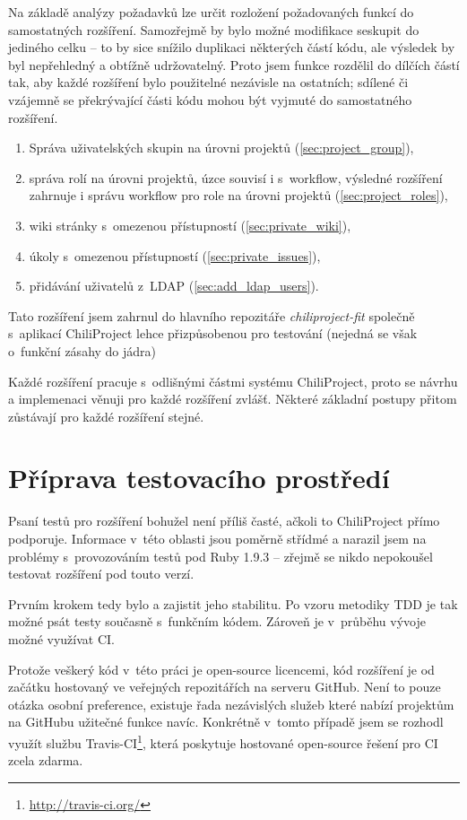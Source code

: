 \documentclass[thesis=B,czech]{FITthesis}[2012/05/02]
\begin{document}
Na základě analýzy požadavků lze určit rozložení požadovaných
funkcí do samostatných rozšíření. Samozřejmě by bylo možné modifikace
seskupit do jediného celku -- to by sice snížilo duplikaci některých částí kódu,
ale výsledek by byl nepřehledný a obtížně udržovatelný. Proto jsem funkce
rozdělil do dílčích částí tak, aby každé rozšíření bylo použitelné
nezávisle na ostatních; sdílené či vzájemně se překrývající části kódu
mohou být vyjmuté do samostatného rozšíření.

\begin{enumerate}
\item Správa uživatelských skupin na úrovni projektů (\ref{sec:project_group}),
\item správa rolí na úrovni projektů, úzce souvisí i s~\gls{workflow}, výsledné rozšíření zahrnuje i
správu workflow pro role na úrovni projektů (\ref{sec:project_roles}),
\item wiki stránky s~omezenou přístupností (\ref{sec:private_wiki}),
\item úkoly s~omezenou přístupností (\ref{sec:private_issues}),
\item přidávání uživatelů z~\gls{LDAP} (\ref{sec:add_ldap_users}).
\end{enumerate}

Tato rozšíření jsem zahrnul do hlavního repozitáře
\emph{chiliproject-fit} společně s~aplikací ChiliProject lehce
přizpůsobenou pro testování (nejedná se však o~funkční zásahy do jádra)

Každé rozšíření pracuje s~odlišnými částmi systému ChiliProject, proto
se návrhu a implemenaci věnuji pro každé rozšíření zvlášť. Některé
základní postupy přitom zůstávají pro každé rozšíření stejné.

\section{Příprava testovacího prostředí}

Psaní testů pro rozšíření bohužel není příliš časté, ačkoli to
ChiliProject přímo podporuje. Informace v~této oblasti jsou poměrně
střídmé a narazil jsem na problémy s~provozováním testů pod Ruby 1.9.3
-- zřejmě se nikdo nepokoušel testovat rozšíření pod touto verzí.

Prvním krokem tedy bylo  a zajistit
jeho stabilitu. Po vzoru metodiky \gls{TDD} je tak možné psát testy
současně s~funkčním kódem. Zároveň je v~průběhu vývoje možné využívat
\gls{CI}.

Protože veškerý kód v~této práci je open-source licencemi, kód rozšíření
je od začátku hostovaný ve veřejných repozitářích na serveru GitHub.
Není to pouze otázka osobní preference, existuje řada nezávislých služeb
které nabízí projektům na GitHubu užitečné funkce navíc. Konkrétně
v~tomto případě jsem se rozhodl využít službu Travis-CI\footnote{\url{http://travis-ci.org/}},
která poskytuje hostované open-source řešení pro \gls{CI} zcela zdarma.
\end{document}
